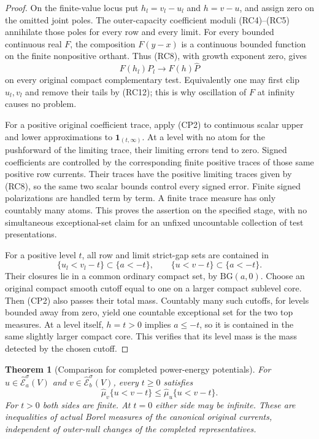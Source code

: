 \documentclass[11pt,a4paper]{article}
\numberwithin{equation}{section}
\newtheorem{theorem}{Theorem}[section]
\theoremstyle{definition}
\theoremstyle{remark}
\begin{document}
\begin{proof}
On the finite-value locus put $h_l=v_l-u_l$ and $h=v-u$,
and assign zero on the omitted joint poles. The outer-capacity
coefficient moduli (RC4)--(RC5) annihilate those poles for every
row and every limit. For every bounded continuous real $F$,
the composition $F(y-x)$ is a continuous bounded function on
the finite nonpositive orthant. Thus (RC8), with growth exponent
zero, gives
\[
                        F(h_l)P_l\longrightarrow F(h)\widehat P
 \tag{CP2}
\]
on every original compact complementary test. Equivalently one
may first clip $u_l,v_l$ and remove their tails by (RC12);
this is why oscillation of $F$ at infinity causes no problem.

For a positive original coefficient trace, apply (CP2) to
continuous scalar upper and lower approximations to
$\mathbf1_{(t,\infty)}$. At a level with no atom for the
pushforward of the limiting trace, their limiting errors tend
to zero. Signed coefficients are controlled by the corresponding
finite positive traces of those same positive row currents.
Their traces have the positive limiting traces given by (RC8),
so the same two scalar bounds control every signed error.
Finite signed polarizations are handled term by term.
A finite trace measure has only
countably many atoms. This proves the assertion on the specified
stage, with no simultaneous exceptional-set claim for an
unfixed uncountable collection of test presentations.

For a positive level $t$, all row and limit strict-gap sets
are contained in
\[
             \{u_l<v_l-t\}\subset\{a<-t\},\qquad
             \{u<v-t\}\subset\{a<-t\}.
 \tag{CP3}
\]
Their closures lie in a common ordinary compact set, by
$\mathrm{BG}(a,0)$. Choose an original compact smooth cutoff
equal to one on a larger compact sublevel core. Then (CP2)
also passes their total mass. Countably many such cutoffs,
for levels bounded away from zero, yield one countable
exceptional set for the two top measures. At a level itself,
$h=t>0$ implies $a\leq-t$, so it is contained in the same
slightly larger compact core. This verifies that its level
mass is the mass detected by the chosen cutoff.
\end{proof}

\begin{theorem}[Comparison for completed power-energy potentials]
\label{thm:r11-completed-comparison}
For $u\in\widehat{\mathcal E}^\sigma_a(V)$ and
$v\in\widehat{\mathcal E}^\sigma_b(V)$, every $t\geq0$ satisfies
\[
       \boxed{\quad
       \widehat\mu_v\{u<v-t\}
                      \leq\widehat\mu_u\{u<v-t\}.
       \quad}
 \tag{CP4}
\]
For $t>0$ both sides are finite. At $t=0$ either side may be
infinite. These are inequalities of actual Borel measures of
the canonical original currents, independent of outer-null
changes of the completed representatives.
\end{theorem}
\end{document}
